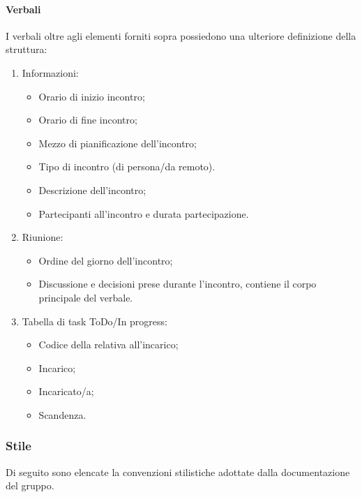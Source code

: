 \paragraph{Verbali}
I verbali oltre agli elementi forniti sopra possiedono una ulteriore definizione della struttura:
\begin{enumerate}
  \item Informazioni:
  \begin{itemize}
    \item Orario di inizio incontro;
    \item Orario di fine incontro;
    \item Mezzo di pianificazione dell'incontro;
    \item Tipo di incontro (di persona/da remoto).
    \item Descrizione dell'incontro;
    \item Partecipanti all'incontro e durata partecipazione.
  \end{itemize}
  \item Riunione:
  \begin{itemize}
    \item Ordine del giorno dell'incontro;
    \item Discussione e decisioni prese durante l'incontro, contiene il corpo principale del verbale.
  \end{itemize}
  \item Tabella di task ToDo/In progress:
  \begin{itemize}
    \item Codice della   relativa all'incarico;
    \item Incarico;
    \item Incaricato/a;
    \item Scandenza.
  \end{itemize}
\end{enumerate}

\subsubsection{Stile}
Di seguito sono elencate la convenzioni stilistiche adottate dalla documentazione del gruppo.

